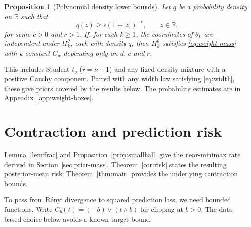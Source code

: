 \documentclass[11pt,a4paper]{article}
\newtheorem{proposition}{Proposition}
\theoremstyle{remark}
\begin{document}
\begin{proposition}[Polynomial density lower bounds]\label{cor:polytail}
Let $q$ be a probability density on $\mathbb R$ such that
\[
q(z)\geq c(1+|z|)^{-r},\qquad z\in\mathbb R,
\]
for some $c>0$ and $r>1$. If, for each $k\geq1$, the coordinates of
$\theta_k$ are independent under $\Pi_k^\theta$, each with density
$q$, then $\Pi_k^\theta$ satisfies \eqref{eq:weight-mass} with a
constant $C_w$ depending only on $d$, $c$ and $r$.
\end{proposition}

This includes Student $t_\nu$ ($r=\nu+1$) and any fixed density
mixture with a positive Cauchy component.
Paired with any width law satisfying \eqref{eq:width}, these give
priors covered by the results below. The probability estimates are
in Appendix~\ref{app:weight-boxes}.

\section{Contraction and prediction risk}\label{sec:results}

Lemma~\ref{lem:frac} and Proposition~\ref{prop:smallball} give the
near-minimax rate derived in Section~\ref{sec:prior-mass}.
Theorem~\ref{cor:risk} states the resulting
posterior-mean risk; Theorem~\ref{thm:main} provides the underlying
contraction bounds.

To pass from R\'enyi divergence to squared prediction loss, we need
bounded functions. Write $C_b(t)=(-b)\vee(t\wedge b)$ for clipping
at $b>0$. The data-based choice below avoids a known target bound.
\end{document}
